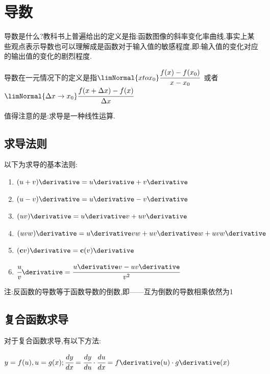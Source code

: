 {{  %



 }%

\section{导数}{
  导数是什么?教科书上普遍给出的定义是指:函数图像的斜率变化率曲线,事实上某些观点表示导数也可以理解成是函数对于输入值的敏感程度,即:输入值的变化对应的输出值的变化的剧烈程度.

  导数在一元情况下的定义是指$\limNormal{x to x_0}\cfrac{f(x) - f(x_0)}{x - x_0}$\ 或者\ $\limNormal{\Delta x \to x_0}\cfrac{f(x + \Delta x) - f(x)}{\Delta x}$

  值得注意的是:求导是一种线性运算.

  \subsection{求导法则}{
    以下为求导的基本法则:
    \begin{enumerate}
      \item $(u + v)\derivative = u\derivative + v\derivative$
      \item $(u - v)\derivative = u\derivative - v\derivative$
      \item $(uv)\derivative = u\derivative v + uv\derivative$
      \item $(uvw)\derivative = u\derivative vw + uv\derivative w + uvw\derivative$
      \item $(\mathbf{c}v)\derivative = \mathbf{c}(v)\derivative$
      \item $\cfrac{u}{v}\derivative = \cfrac{u\derivative v - uv\derivative}{v^2}$
    \end{enumerate}
    注:反函数的导数等于函数导数的倒数,即——互为倒数的导数相乘依然为1
  }%

  \subsection{复合函数求导}{
    对于复合函数求导,有以下方法:

    $y = f(u), u = g(x); \cfrac{dy}{dx} = \cfrac{dy}{du} \cdot \cfrac{du}{dx} = f\derivative(u) \cdot g\derivative(x)$
  }%

}}
